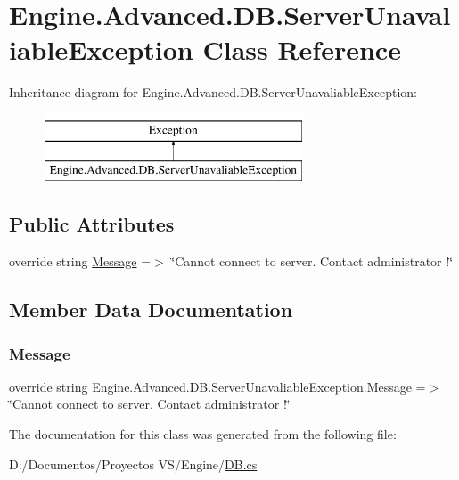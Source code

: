 \hypertarget{class_engine_1_1_advanced_1_1_d_b_1_1_server_unavaliable_exception}{}\section{Engine.\+Advanced.\+D\+B.\+Server\+Unavaliable\+Exception Class Reference}
\label{class_engine_1_1_advanced_1_1_d_b_1_1_server_unavaliable_exception}
Inheritance diagram for Engine.\+Advanced.\+D\+B.\+Server\+Unavaliable\+Exception\+:\begin{figure}[H]
\begin{center}
\leavevmode
\includegraphics[height=2.000000cm]{class_engine_1_1_advanced_1_1_d_b_1_1_server_unavaliable_exception}
\end{center}
\end{figure}
\subsection*{Public Attributes}
\begin{DoxyCompactItemize}
\item 
override string \mbox{\hyperlink{class_engine_1_1_advanced_1_1_d_b_1_1_server_unavaliable_exception_a790d5bb2bcb9533c642fc18b97eb4b6e}{Message}} =$>$ \char`\"{}Cannot connect to server. Contact administrator !\char`\"{}
\end{DoxyCompactItemize}


\subsection{Member Data Documentation}
\mbox{\label{class_engine_1_1_advanced_1_1_d_b_1_1_server_unavaliable_exception_a790d5bb2bcb9533c642fc18b97eb4b6e}} 
\subsubsection{\texorpdfstring{Message}{Message}}
{\footnotesize\ttfamily override string Engine.\+Advanced.\+D\+B.\+Server\+Unavaliable\+Exception.\+Message =$>$ \char`\"{}Cannot connect to server. Contact administrator !\char`\"{}}



The documentation for this class was generated from the following file\+:\begin{DoxyCompactItemize}
\item 
D\+:/\+Documentos/\+Proyectos V\+S/\+Engine/\mbox{\hyperlink{_d_b_8cs}{D\+B.\+cs}}\end{DoxyCompactItemize}
